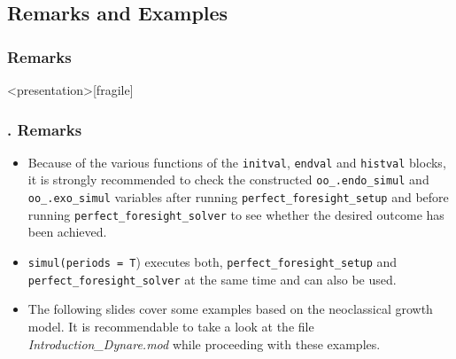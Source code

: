 \documentclass[11pt,aspectratio=169]{beamer}
\begin{document}
\subsection{Remarks and Examples}
\subsubsection{Remarks}
\begin{frame}<presentation>[fragile]
	\frametitle{{\thesection.\thesubsection\thinspace\thesubsubsection} Remarks}
	\begin{itemize}
		\item Because of the various functions of the \texttt{initval}, \texttt{endval} and \texttt{histval} blocks, it is strongly recommended to check the constructed \texttt{oo\_.endo\_simul} and \texttt{oo\_.exo\_simul} variables after running \texttt{perfect\_foresight\_setup} and before running \texttt{perfect\_foresight\_solver} to see whether the desired outcome has been achieved.
		\item \texttt{simul(periods = T}) executes both,  \texttt{perfect\_foresight\_setup} and \linebreak \texttt{perfect\_foresight\_solver} at the same time and can also be used.
		\item The following slides cover some examples based on the neoclassical growth model. It is recommendable to take a look at the file \textit{Introduction\_Dynare.mod} while proceeding with these examples.
	\end{itemize}
\end{frame}
\end{document}
